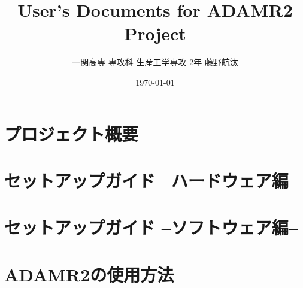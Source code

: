 \documentclass[uplatex, a4paper]{jsreport}
\title{\Huge User's Documents for ADAMR2 Project}
\author{一関高専 専攻科 生産工学専攻 2年 藤野航汰}
\date{\today}
\begin{document}
\maketitle  %

\tableofcontents  %
\newpage

\chapter{プロジェクト概要}




\chapter{セットアップガイド --ハードウェア編--}



\chapter{セットアップガイド --ソフトウェア編--}




\chapter{ADAMR2の使用方法}


\end{document}
